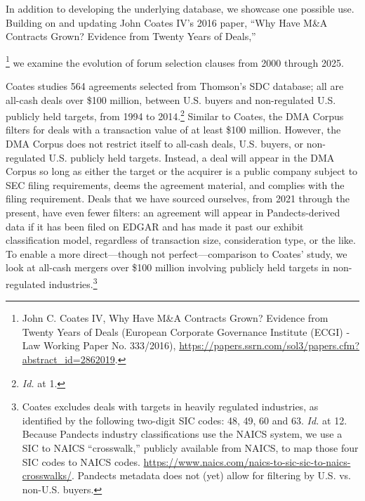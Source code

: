 \documentclass[12pt]{article}
\begin{document}
In addition to developing the underlying database, we showcase one possible use. Building on and updating John Coates IV’s 2016 paper, “Why Have M\&A Contracts Grown? Evidence from Twenty Years of Deals,”{%
 \footnote{John C. Coates IV, Why Have M\&A Contracts Grown? Evidence from Twenty Years of Deals (European Corporate Governance Institute (ECGI) - Law Working Paper No. 333/2016), \url{https://papers.ssrn.com/sol3/papers.cfm?abstract_id=2862019}.\label{fn:coates}} we examine the evolution of forum selection clauses from 2000 through 2025.%

Coates studies 564 agreements selected from Thomson's SDC database; all are all-cash deals over \$100 million, between U.S. buyers and non-regulated U.S. publicly held targets, from 1994 to 2014.\footnote{\emph{Id.} at 1.} Similar to Coates, the DMA Corpus filters for deals with a transaction value of at least \$100 million. However, the DMA Corpus does not restrict itself to all-cash deals, U.S. buyers, or non-regulated U.S. publicly held targets. Instead, a deal will appear in the DMA Corpus so long as either the target or the acquirer is a public company subject to SEC filing requirements, deems the agreement material, and complies with the filing requirement. Deals that we have sourced ourselves, from 2021 through the present, have even fewer filters: an agreement will appear in Pandects-derived data if it has been filed on EDGAR and has made it past our exhibit classification model, regardless of transaction size, consideration type, or the like. To enable a more direct—though not perfect—comparison to Coates' study, we look at all-cash mergers over \$100 million involving publicly held targets in non-regulated industries.\footnote{Coates excludes deals with targets in heavily regulated industries, as identified by the following two-digit SIC codes: 48, 49, 60 and 63. \emph{Id.} at 12. Because Pandects industry classifications use the NAICS system, we use a SIC to NAICS ``crosswalk,'' publicly available from NAICS, to map those four SIC codes to NAICS codes. \url{https://www.naics.com/naics-to-sic-sic-to-naics-crosswalks/}. Pandects metadata does not (yet) allow for filtering by U.S. vs. non-U.S. buyers.}

}
\end{document}
